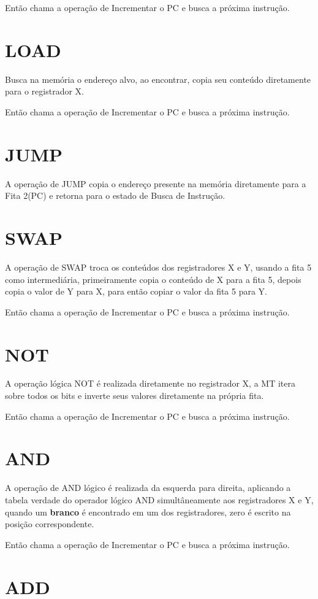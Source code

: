 \documentclass[a4paper,12pt]{article}
\begin{document}
Então chama a operação de Incrementar o PC e busca a próxima instrução.

\section*{LOAD}
Busca na memória o endereço alvo, ao encontrar, copia seu conteúdo diretamente para o registrador X.

Então chama a operação de Incrementar o PC e busca a próxima instrução.

\section*{JUMP}
A operação de JUMP copia o endereço presente na memória diretamente para a Fita 2(PC) e retorna para o estado de Busca de Instrução.

\section*{SWAP}
A operação de SWAP troca os conteúdos dos registradores X e Y, usando a fita 5 como intermediária, primeiramente copia o conteúdo de X para a fita 5, depois copia o valor de Y para X, para então copiar o valor da fita 5 para Y.

Então chama a operação de Incrementar o PC e busca a próxima instrução.

\section*{NOT}
A operação lógica NOT é realizada diretamente no registrador X, a MT itera sobre todos os bits e inverte seus valores diretamente na própria fita.

Então chama a operação de Incrementar o PC e busca a próxima instrução.

\section*{AND}
A operação de AND lógico é realizada da esquerda para direita, aplicando a tabela verdade do operador lógico AND simultâneamente aos registradores X e Y, quando um \textbf{branco} é encontrado em um dos registradores, zero é escrito na posição correspondente.

Então chama a operação de Incrementar o PC e busca a próxima instrução.
\section*{ADD}
\end{document}
